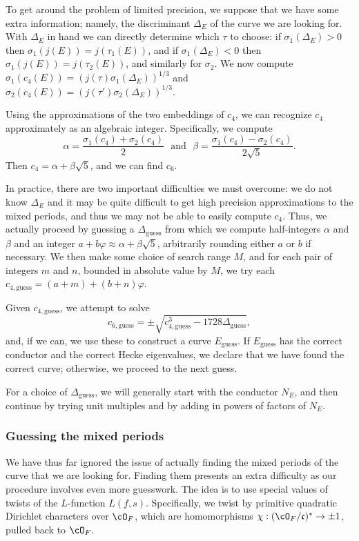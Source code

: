 \documentclass{amsart}
\newcommand{\fc}{\mathfrak{c}}
\newcommand{\OF}{\cO_F}
\begin{document}
To get around the problem of limited precision, we suppose that we have some extra information; 
namely, the discriminant $\Delta_E$ of the curve we are looking for.  With $\Delta_E$ in
hand we can directly determine which $\tau$ to choose: if $\sigma_1(\Delta_E) > 0$ then
$\sigma_1(j(E)) = j(\tau_1(E))$, and if $\sigma_1(\Delta_E) < 0$ then $\sigma_1(j(E)) = j(\tau_2(E))$,
and similarly for $\sigma_2$. We now compute $\sigma_1(c_4(E)) = (j(\tau) \sigma_1(\Delta_E))^{1/3}$
and $\sigma_2(c_4(E)) = (j(\tau') \sigma_2(\Delta_E))^{1/3}$.

Using the approximations of the two embeddings of $c_4$, we can recognize $c_4$ approximately
as an algebraic integer. Specifically, we compute
\[
    \alpha = \frac{\sigma_1(c_4) + \sigma_2(c_4)}{2}\ \ \  \text{and} \ \ \ 
    \beta = \frac{\sigma_1(c_4) - \sigma_2(c_4)}{2\sqrt{5}}.
\]
Then $c_4 = \alpha + \beta\sqrt{5}$, and we can find $c_6$.

\newcommand{\Deltaguess}{\Delta_{\textrm{guess}}}
\newcommand{\cfourguess}{c_{4,\textrm{guess}}}
\newcommand{\csixguess}{c_{6,\textrm{guess}}}
\newcommand{\Eguess}{E_\textrm{guess}}

In practice, there are two important difficulties we must overcome: we do not know
$\Delta_E$ and it may be quite difficult to get high precision approximations to the
mixed periods, and thus we may not be able to easily compute $c_4$. Thus, we actually
proceed by guessing a $\Deltaguess$ from which we
compute half-integers $\alpha$ and $\beta$ and an integer
$a + b\varphi \approx \alpha + \beta\sqrt5$, arbitrarily rounding either $a$ or $b$ if necessary.
We then make some choice of search range $M$, and for each pair of integers $m$ and $n$,
bounded in absolute value by $M$, we try each $\cfourguess = (a + m) + (b + n)\varphi$.

Given $\cfourguess$, we attempt to solve
\[
    \csixguess = \pm \sqrt{ \cfourguess^3 - 1728 \Deltaguess },
\]
and, if we can, we use these to construct a curve $\Eguess$. If $\Eguess$ has
the correct conductor and the correct Hecke eigenvalues, we declare that
we have found the correct curve; otherwise, we proceed to the next guess.

For a choice of $\Deltaguess$, we will generally start with the conductor $N_E$,
and then continue by trying unit multiples and by adding in powers of factors of $N_E$.

\subsubsection{Guessing the mixed periods}
We have thus far ignored the issue of actually finding the mixed periods of the curve that
we are looking for. Finding them presents an extra difficulty as our procedure involves
even more guesswork. The idea is to use special values of twists of the $L$-function
$L(f, s)$. Specifically, we twist by primitive quadratic Dirichlet characters over $\OF$,
which are homomorphisms $\chi : (\OF/\fc)^* \rightarrow \pm1$, pulled back to $\OF$.
\end{document}
